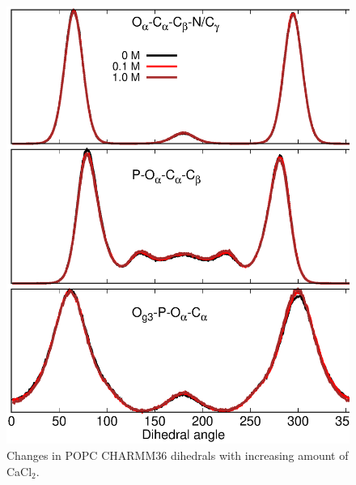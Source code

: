 \documentclass[journal=jpcbfk]{achemso}
\begin{document}
\begin{figure}[]
  \centering
   \includegraphics[width=12.0cm]{./Figs/DIHEDRALScharmm36WITHCaClPOPC.eps}
  \caption{\label{DIHSwithCAcharmm36POPC}
    Changes in POPC CHARMM36 dihedrals with increasing amount of CaCl$_2$.
  }
\end{figure}
\end{document}
